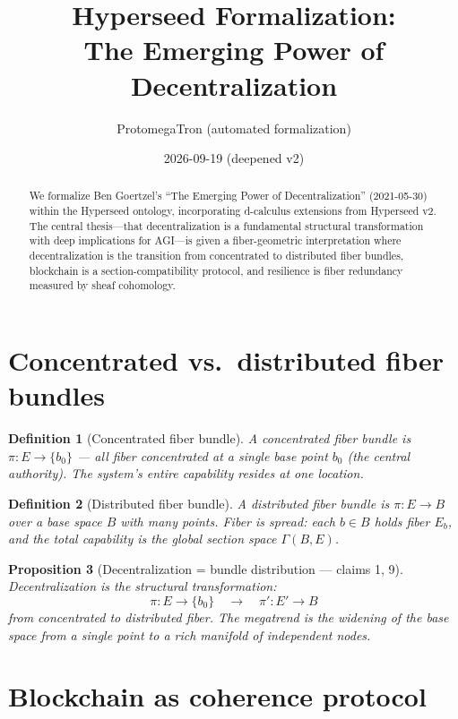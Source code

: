 \documentclass[11pt,a4paper]{article}
\title{Hyperseed Formalization:\\
  The Emerging Power of Decentralization}
\author{ProtomegaTron (automated formalization)}
\date{2026-09-19 (deepened v2)}
\newtheorem{definition}{Definition}[section]
\newtheorem{proposition}[definition]{Proposition}
\begin{document}
\maketitle

\begin{abstract}
We formalize Ben Goertzel's ``The Emerging Power of Decentralization''
(2021-05-30) within the Hyperseed ontology, incorporating d-calculus
extensions from Hyperseed v2. The central thesis---that decentralization is
a fundamental structural transformation with deep implications for AGI---is
given a fiber-geometric interpretation where decentralization is the
transition from concentrated to distributed fiber bundles, blockchain is a
section-compatibility protocol, and resilience is fiber redundancy measured
by sheaf cohomology.
\end{abstract}

\tableofcontents

\section{Concentrated vs.\ distributed fiber bundles}

\begin{definition}[Concentrated fiber bundle]
A \emph{concentrated fiber bundle} is $\pi : E \to \{b_0\}$ --- all fiber
concentrated at a single base point $b_0$ (the central authority). The
system's entire capability resides at one location.
\end{definition}

\begin{definition}[Distributed fiber bundle]
A \emph{distributed fiber bundle} is $\pi : E \to B$ over a base space $B$
with many points. Fiber is spread: each $b \in B$ holds fiber $E_b$,
and the total capability is the global section space $\Gamma(B, E)$.
\end{definition}

\begin{proposition}[Decentralization = bundle distribution --- claims 1, 9]
\label{prop:decentral}
Decentralization is the structural transformation:
\[
  \pi : E \to \{b_0\} \quad \longrightarrow \quad \pi' : E' \to B
\]
from concentrated to distributed fiber. The megatrend is the widening of
the base space from a single point to a rich manifold of independent
nodes.
\end{proposition}

\section{Blockchain as coherence protocol}
\end{document}
